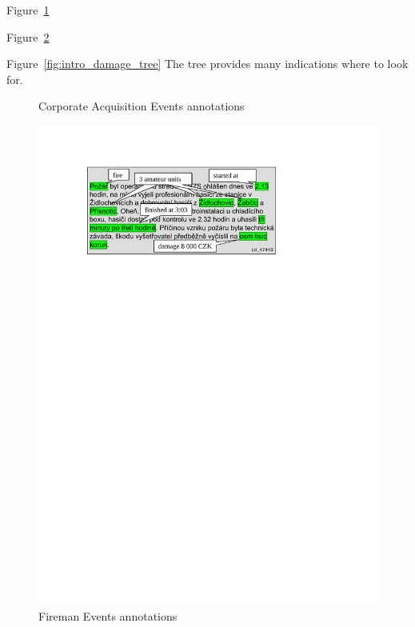 Figure~\ref{fig:acquisitions_annotated}

Figure~\ref{fig:fireman_annotated}

Figure~\ref{fig:intro_damage_tree} The tree provides many indications where to look for.

\begin{figure}
\centering
{}
\caption{Corporate Acquisition Events annotations}
\label{fig:acquisitions_annotated}
\end{figure}


\begin{figure}
\centering
\includegraphics[width=0.65\hsize]{fireman_annotated}
\caption{Fireman Events annotations}
\label{fig:fireman_annotated}
\end{figure}


